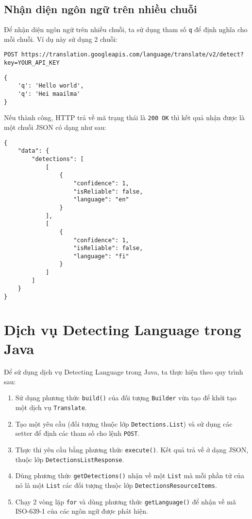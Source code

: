 \documentclass[../thesis.tex]{subfiles}
\begin{document}
\subsection{Nhận diện ngôn ngữ trên nhiều chuỗi}
Để nhận diện ngôn ngữ trên nhiều chuỗi, ta sử dụng tham số \lstinline{q} để định nghĩa cho mỗi chuỗi. Ví dụ này sử dụng 2 chuỗi:
\begin{lstlisting}[style=link]
POST https://translation.googleapis.com/language/translate/v2/detect?key=YOUR_API_KEY
\end{lstlisting}
\begin{lstlisting}[style=link]
{
	'q': 'Hello world',
	'q': 'Hei maailma'
}
\end{lstlisting}

Nếu thành công, HTTP trả về mã trạng thái là \lstinline{200 OK} thì kết quả nhận được là một chuỗi JSON có dạng như sau:

\begin{lstlisting}[style=link]
{
	"data": {
		"detections": [
			[
				{
					"confidence": 1,
					"isReliable": false,
					"language": "en"
				}
			],
			[
				{
					"confidence": 1,
					"isReliable": false,
					"language": "fi"
				}
			]
		]
	}
}
\end{lstlisting}

\section{Dịch vụ Detecting Language trong Java}
Để sử dụng dịch vụ Detecting Language trong Java, ta thực hiện theo quy trình sau:
\begin{enumerate}
  \item Sử dụng phương thức \lstinline{build()} của đối tượng \lstinline{Builder} vừa tạo để khởi tạo một dịch vụ \lstinline{Translate}.
  \item Tạo một yêu cầu (đối tượng thuộc lớp \lstinline{Detections.List}) và sử dụng các setter để định các tham số cho lệnh \lstinline{POST}.
  \item Thực thi yêu cầu bằng phương thức \lstinline{execute()}. Kết quả trả về ở dạng JSON, thuộc lớp \lstinline{DetectionsListResponse}.
  \item Dùng phương thức \lstinline{getDetections()} nhận về một \lstinline{List} mà mỗi phần tử của nó là một \lstinline{List} các đối tượng thuộc lớp \lstinline{DetectionsResourceItems}.
  \item Chạy 2 vòng lặp \lstinline{for} và dùng phương thức \lstinline{getLanguage()} để nhận về mã ISO-639-1 của các ngôn ngữ được phát hiện.
\end{enumerate}


\end{document}
